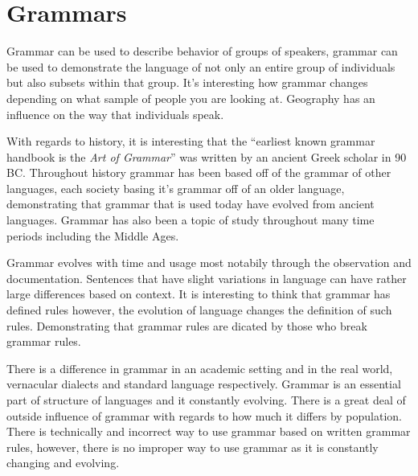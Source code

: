 \documentclass{article}
\begin{document}
\section{Grammars}

\medskip

Grammar can be used to describe behavior of groups of speakers, grammar can be used to demonstrate the language of not only an
entire group of individuals but also subsets within that group. It's interesting how grammar changes depending on what sample 
of people you are looking at. Geography has an influence on the way that individuals speak.

\medskip

With regards to history, it is interesting that the ``earliest known grammar handbook is the \textit{Art of Grammar}'' was written
by an ancient Greek scholar in 90 BC. Throughout history grammar has been based off of the grammar of other languages, each society
basing it's grammar off of an older language, demonstrating that grammar that is used today have evolved from ancient languages.
Grammar has also been a topic of study throughout many time periods including the Middle Ages.

\medskip

Grammar evolves with time and usage most notabily through the observation and documentation. Sentences that have slight variations in
language can have rather large differences based on context. It is interesting to think that grammar has defined rules however, the 
evolution of language changes the definition of such rules. Demonstrating that grammar rules are dicated by those who break grammar 
rules. 

\medskip

There is a difference in grammar in an academic setting and in the real world, vernacular dialects and standard language respectively.
Grammar is an essential part of structure of languages and it constantly evolving. There is a great deal of outside influence of grammar
with regards to how much it differs by population. There is technically and incorrect way to use grammar based on written grammar rules,
however, there is no improper way to use grammar as it is constantly changing and evolving.
\end{document}
